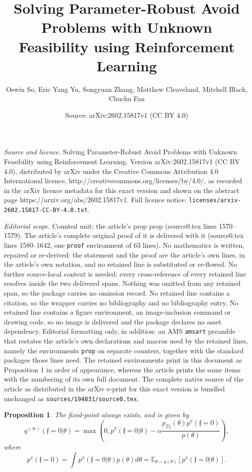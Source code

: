 \documentclass[10pt,a4paper]{amsart}
\title{Solving Parameter-Robust Avoid Problems with Unknown Feasibility using Reinforcement Learning}
\author{Oswin So, Eric Yang Yu, Songyuan Zhang, Matthew Cleaveland, Mitchell Black, Chuchu Fan}
\date{Source: arXiv:2602.15817v1 (CC BY 4.0)}
\newtheorem{prop}{Proposition}
\newcommand{\E}{\mathbb{E}}
\newcommand{\MeasuredCISet}{\mathcal{D}_{\feas{}}}
\newcommand{\feas}{\mathfrak{f}}
\begin{document}
\maketitle

\noindent\emph{Source and licence.} Solving Parameter-Robust Avoid Problems with Unknown Feasibility using Reinforcement Learning. Version arXiv:2602.15817v1 (CC BY 4.0), distributed by arXiv under the Creative Commons Attribution 4.0 International licence, http://creativecommons.org/licenses/by/4.0/, as recorded in the arXiv licence metadata for this exact version and shown on the abstract page https://arxiv.org/abs/2602.15817v1. Full licence notice: \texttt{licenses/arxiv-2602.15817-CC-BY-4.0.txt}.\par\smallskip

\noindent\textit{Editorial scope.} Counted unit: the article's prop prop (source0.tex lines 1570--1579). The article's complete original proof of it is delivered with it (source0.tex lines 1580--1642, one \texttt{proof} environment of 63 lines). No mathematics is written, repaired or re-derived: the statement and the proof are the article's own lines, in the article's own notation, and no retained line is substituted or re-flowed.  No further source-local context is needed: every cross-reference of every retained line resolves inside the two delivered spans.  Nothing was omitted from any retained span, so the package carries no omission record.  No retained line contains a citation, so the wrapper carries no bibliography and no bibliography entry.  No retained line contains a figure environment, an image-inclusion command or drawing code, so no image is delivered and the package declares no asset dependency.  Editorial formatting only, in addition: an AMS \texttt{amsart} preamble that restates the article's own declarations and macros used by the retained lines, namely the environments \texttt{prop} on separate counters, together with the standard packages those lines need.  The retained environments print in this document as Proposition 1 in order of appearance, whereas the article prints the same items with the numbering of its own full document.  The complete native source of the article as distributed in the arXiv e-print for this exact version is bundled unchanged as \texttt{sources/194831/source0.tex}.
\begin{prop}
    The fixed-point always exists, and is given by 
    \begin{equation}
        q^{(\infty)}(\feas{}=0 | \theta) = \max \left( 0, p^\pi(\feas{}=0 | \theta) - \alpha \frac{ p_{\MeasuredCISet}(\theta) p^\pi(\feas{}=0) }{ p(\theta) } \right),
    \end{equation}  
    where
    \begin{equation}
        p^\pi(\feas{}=0) = \int p^\pi(\feas{}=0 | \theta) p(\theta) d\theta = \E_{\theta \sim p(\theta)} \left[ p^\pi(\feas{}=0 | \theta) \right].
    \end{equation}
\end{prop}
\end{document}
